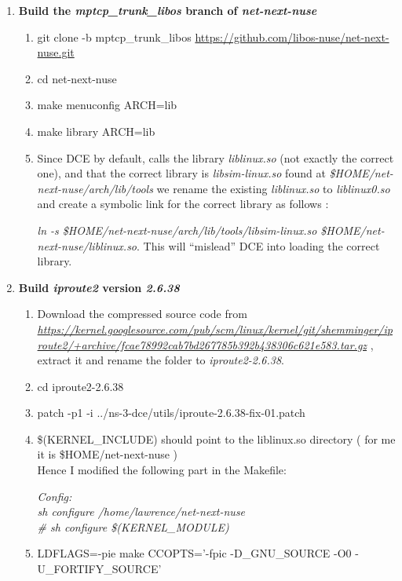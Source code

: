 \documentclass[a4paper,11pt]{article}
\begin{document}
\begin{enumerate}
\begin{enumerate}
				\end{enumerate}

			\item \textbf{Build the \emph{mptcp\_trunk\_libos} branch of \emph{net-next-nuse}}
				\begin{enumerate}

					\item git clone -b mptcp\_trunk\_libos \url{https://github.com/libos-nuse/net-next-nuse.git}
					\item cd net-next-nuse
					\item make menuconfig ARCH=lib
					\item make library ARCH=lib
					\item Since DCE by default, calls the library \emph{liblinux.so} (not exactly the correct one), and that the correct library is \emph{libsim-linux.so} found at \emph{\$HOME/net-next-nuse/arch/lib/tools} we rename the existing \emph{liblinux.so} to \emph{liblinux0.so} and create a symbolic link for the correct library as follows :

					\emph{ln -s \$HOME/net-next-nuse/arch/lib/tools/libsim-linux.so \$HOME/net-next-nuse/liblinux.so}.
					This will ``mislead'' DCE into loading the correct library.

				\end{enumerate}

			\item \textbf{Build \emph{iproute2} version \emph{2.6.38}}

				\begin{enumerate}
					\sloppy
					\item Download the compressed source code from \\
					\nohyphens{\emph{\url{https://kernel.googlesource.com/pub/scm/linux/kernel/git/shemminger/iproute2/+archive/fcae78992cab7bd267785b392b438306c621e583.tar.gz}}} , extract it and rename the folder to \emph{iproute2-2.6.38}. 
					\item cd iproute2-2.6.38
					\item patch -p1 -i ../ns-3-dce/utils/iproute-2.6.38-fix-01.patch
					\item \$(KERNEL\_INCLUDE) should point to the liblinux.so directory ( for me it is \$HOME/net-next-nuse ) \\
					Hence I modified the following part in the Makefile:

					\emph{
					Config: \\
	                   \hspace*{2cm}sh configure /home/lawrence/net-next-nuse \\
	                   \hspace*{2cm}\# sh configure \$(KERNEL\_MODULE) }
	                \item \raggedright{LDFLAGS=-pie make CCOPTS='-fpic -D\_GNU\_SOURCE -O0 -U\_FORTIFY\_SOURCE'}


\end{enumerate}
\end{enumerate}
\end{document}
